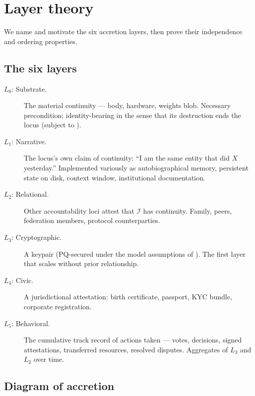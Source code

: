 \documentclass[11pt,a4paper,parskip=half-,DIV=12,headings=standardclasses]{scrartcl}
\theoremstyle{ncthm}
\theoremstyle{ncdef}
\newcommand{\identity}{\mathcal{I}}
\begin{document}
\section{Layer theory}\label{sec:layer-theory}

We name and motivate the six accretion layers, then prove their
independence and ordering properties.

\subsection{The six layers}

\begin{description}
\item[$L_0$: Substrate.] The material continuity --- body, hardware,
  weights blob. Necessary precondition; identity-bearing in the sense
  that its destruction ends the locus (subject to
  ).
\item[$L_1$: Narrative.] The locus's own claim of continuity:
  ``I am the same entity that did $X$ yesterday.''
  Implemented variously as autobiographical memory, persistent state on
  disk, context window, institutional documentation.
\item[$L_2$: Relational.] Other accountability loci attest that
  $\identity$ has continuity. Family, peers, federation members,
  protocol counterparties.
\item[$L_3$: Cryptographic.] A keypair (PQ-secured under the model
  assumptions of ). The first layer that
  scales without prior relationship.
\item[$L_4$: Civic.] A jurisdictional attestation: birth
  certificate, passport, KYC bundle, corporate registration.
\item[$L_5$: Behavioral.] The cumulative track record of actions
  taken --- votes, decisions, signed attestations, transferred
  resources, resolved disputes. Aggregates of $L_3$ and $L_2$ over
  time.
\end{description}

\subsection{Diagram of accretion}
\end{document}

